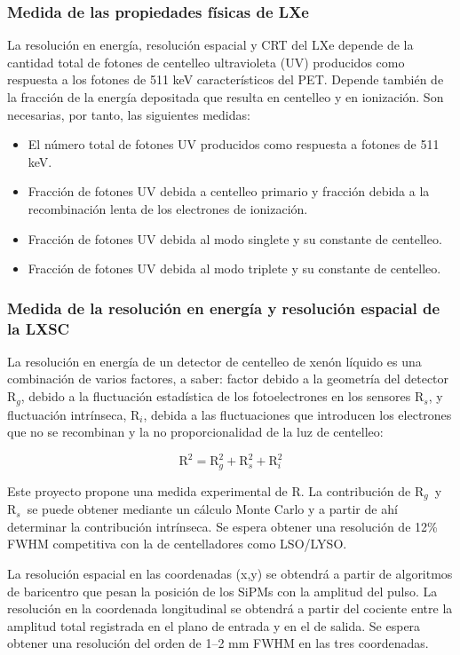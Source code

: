 \subsubsection*{Medida de las propiedades físicas de LXe}
La resolución en energía, resolución espacial y CRT del LXe depende de la cantidad total de fotones de centelleo ultravioleta (UV) producidos como respuesta a los fotones de 511 keV característicos del PET. Depende también de la fracción de la energía depositada que resulta en centelleo y en ionización. Son necesarias, por tanto, las siguientes medidas:
\begin{itemize}
\item El número total de fotones UV producidos como respuesta a fotones de 511 keV. 
\item Fracción de fotones UV debida a centelleo primario y fracción debida a la recombinación lenta de los electrones de ionización. 
\item Fracción de fotones UV debida al modo singlete y su constante de centelleo.
\item Fracción de fotones UV debida al modo triplete y su constante de centelleo. 
\end{itemize}

\subsubsection*{Medida de la resolución en energía y resolución espacial de la LXSC}

La resolución en energía de un detector de centelleo de xenón líquido es una combinación de varios factores, a saber: factor debido a la geometría del detector R$_g$, debido a la fluctuación estadística de los fotoelectrones en los sensores R$_s$, y fluctuación intrínseca, R$_i$, debida a las fluctuaciones que introducen los electrones que no se recombinan y la no proporcionalidad de la luz de centelleo:

\begin{equation}
\mathrm{R}^2 = \mathrm{R}_g^2 + \mathrm{R}_s^2 +  \mathrm{R}_i^2
\end{equation}

Este proyecto propone una medida experimental de R. La contribución de 
R$_g$~y R$_s$~se puede obtener mediante un cálculo Monte Carlo y a partir de ahí determinar la contribución intrínseca. Se espera obtener una resolución de 12\% FWHM competitiva con la de centelladores como LSO/LYSO. 

La resolución espacial en las coordenadas (x,y) se obtendrá a partir de algoritmos de baricentro que pesan la posición de los SiPMs con la amplitud del pulso. La resolución en la coordenada longitudinal se obtendrá a partir del cociente entre la amplitud total registrada en el plano de entrada y en el de salida. Se espera obtener una resolución del orden de 1--2 mm FWHM en las tres coordenadas.     

